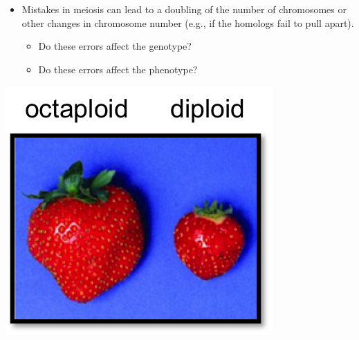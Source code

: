 \begin{frame}[t]
    \begin{adjustwidth}{-1.5em}{-1.5em}
        \begin{itemize}
            \item Mistakes in meiosis can lead to a doubling of the number of
                chromosomes or other changes in chromosome number (e.g., if the
                homologs fail to pull apart).

                \begin{itemize}
                    \item Do these errors affect the genotype?


                    \vspace{7mm}
                    \item Do these errors affect the phenotype?

                \end{itemize}

        \end{itemize}
        \vspace{5mm}
        \begin{flushright}
            \includegraphics[height=0.28\textheight]{strawberry-ploidy.png}
        \end{flushright}
    \end{adjustwidth}
\end{frame}

